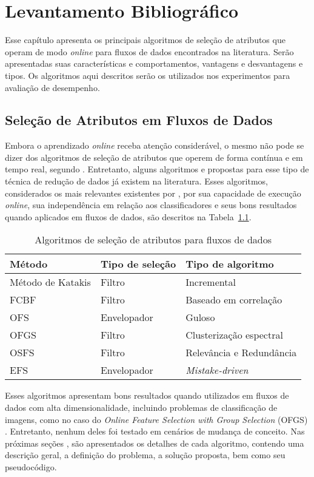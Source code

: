 \chapter{Levantamento Bibliográfico}\label{chp:levantamento}

Esse capítulo apresenta os principais algoritmos de seleção de atributos que operam de modo \textit{online} para fluxos de dados encontrados na literatura. Serão apresentadas suas características e comportamentos, vantagens e desvantagens e tipos. Os algoritmos aqui descritos serão os utilizados nos experimentos para avaliação de desempenho.

\section{Seleção de Atributos em Fluxos de Dados}\label{sec: lev_algoritmos}

Embora o aprendizado \textit{online} receba atenção considerável, o mesmo não pode se dizer dos algoritmos de seleção de atributos que operem de forma contínua e em tempo real, segundo . Entretanto, alguns algoritmos e propostas para esse tipo de técnica de redução de dados já existem na literatura. Esses algoritmos, considerados os mais relevantes existentes por , por sua capacidade de execução \textit{online}, sua independência em relação aos classificadores e seus bons resultados quando aplicados em fluxos de dados, são descritos na Tabela~\ref{tab:algoritmos}. 

\begin{table}[!h]
\centering
\caption{Algoritmos de seleção de atributos para fluxos de dados}
\label{tab:algoritmos}
\begin{tabular}{lll}
\hline
Método &  Tipo de seleção & Tipo de algoritmo \\ \hline
Método de Katakis & Filtro & Incremental \\
FCBF &  Filtro & Baseado em correlação\\
OFS &  Envelopador &  Guloso\\ 
OFGS &  Filtro &  Clusterização espectral\\ 
OSFS &  Filtro &  Relevância e Redundância\\ 
EFS & Envelopador & \textit{Mistake-driven} \\ \hline
\end{tabular}
\end{table}


Esses algoritmos apresentam bons resultados quando utilizados em fluxos de dados com alta dimensionalidade, incluindo problemas de classificação de imagens, como no caso do 
\textit{Online Feature Selection with Group Selection} (OFGS)
\cite{Wang2015}. Entretanto, nenhum deles foi testado em cenários de mudança de conceito. Nas próximas 
seções
, são apresentados os detalhes de cada algoritmo, contendo uma descrição geral, a definição do problema, a solução proposta, bem como seu pseudocódigo.



